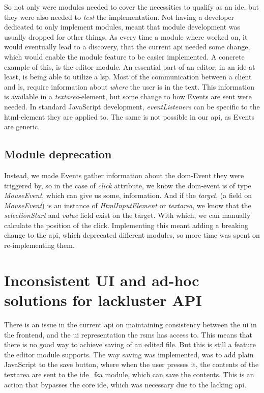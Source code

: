 So not only were modules needed to cover the necessities to qualify as an
\gls*{ide}, but they were also needed to \textit{test} the implementation. Not
having a developer dedicated to only implement modules, meant that module
development was usually dropped for other things. As every time a module where
worked on, it would eventually lead to a discovery, that the current \gls*{api}
needed some change, which would enable the module feature to be easier
implemented. A concrete example of this, is the editor module.
An essential part of an editor, in an \gls*{ide} at least, is being able to
utilize a \gls*{lsp}. Most of the communication between a client and \gls*{ls},
require information about \textit{where} the user is in the text. This
information is available in a \textit{textarea}-element, but some change to how
Events are sent were needed. In standard JavaScript development,
\textit{eventListeners} can be specific to the \gls*{html}-element they are
applied to. The same is not possible in our \gls*{api}, as Events are generic.


\subsection{Module deprecation}

Instead, we made Events gather information about the \gls*{dom}-Event they were
triggered by, so in the case of \textit{click} attribute, we know the
\gls*{dom}-event is of type \textit{MouseEvent}, which can give us some,
information. And if the \textit{target}, (a field on \textit{MouseEvent}) is an
instance of \textit{HtmlInputElement} or \textit{textarea}, we know that the
\textit{selectionStart} and \textit{value} field exist on the target. With
which, we can manually calculate the position of the click. Implementing this
meant adding a breaking change to the \gls*{api}, which deprecated different
modules, so more time was spent on re-implementing them.


\section{Inconsistent UI and ad-hoc solutions for lackluster API} \label{sec:lackluster}

There is an issue in the current \gls*{api} on maintaining consistency between
the \gls*{ui} in the frontend, and the \gls*{ui} representation the \gls*{rsms}
has access to. This means that there is no good way to achieve saving of an
edited file. But this is still a feature the editor module supports. The way
saving was implemented, was to add plain JavaScript to the save button, where
when the user presses it, the contents of the textarea are sent to the ide\_fsa
module, which can save the contents. This is an action that bypasses the core
\gls*{ide}, which was necessary due to the lacking \gls*{api}.


